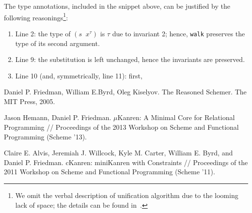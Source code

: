 \documentclass[10pt, oneside, nocopyrightspace]{sigplanconf}
\begin{document}
The type annotations, included in the snippet above, can be justified by the following 
reasonings\footnote{We omit the verbal description of unification algorithm due to the 
looming lack of space; the details can be found in~\cite{MicroKanren}.}:

\begin{enumerate}
\item Line 2: the type of \mbox{$(s\;\;x^\tau)$} is $\tau$ due to invariant 2; hence, 
\lstinline{walk} preserves the type of its second argument.

\item Line 9: the substitution is left unchanged, hence the invariants are preserved.

\item Line 10 (and, symmetrically, line 11): first, 
\end{enumerate}

\begin{thebibliography}{99}
Daniel P. Friedman, William E.Byrd, Oleg Kiselyov. The Reasoned Schemer. The MIT
Press, 2005.

Jason Hemann, Daniel P. Friedman. $\mu$Kanren: A Minimal Core for Relational Programming //
Proceedings of the 2013 Workshop on Scheme and Functional Programming (Scheme '13).

Claire E. Alvis, Jeremiah J. Willcock, Kyle M. Carter, William E. Byrd, and Daniel P. Friedman.
cKanren: miniKanren with Constraints // 
Proceedings of the 2011 Workshop on Scheme and Functional Programming (Scheme '11).

\end{thebibliography}
\end{document}
